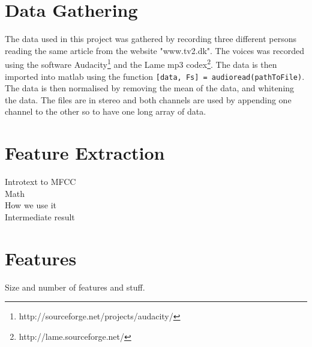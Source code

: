 \section{Data Gathering}
The data used in this project was gathered by recording three different persons reading the same article from the website "www.tv2.dk". The voices was recorded using the software Audacity\footnote{http://sourceforge.net/projects/audacity/} and the Lame mp3 codex\footnote{http://lame.sourceforge.net/}. The data is then imported into matlab using the function \texttt{[data, Fs] = audioread(pathToFile)}. The data is then normalised by removing the mean of the data, and whitening the data. The files are in stereo and both channels are used by appending one channel to the other so to have one long array of data.

\section{Feature Extraction}

Introtext to MFCC\\

Math\\

How we use it\\

Intermediate result\\

\section{Features}

Size and number of features and stuff.

